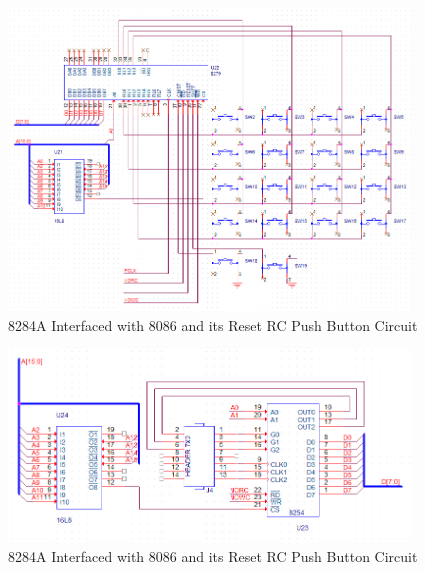         \begin{figure}[ht]
            \begin{center}
                \includegraphics[width=0.95\textwidth]{figures/schematics/page6.png}
                \caption{8284A Interfaced with 8086 and its Reset RC Push Button Circuit} \label{fig:page6}
            \end{center}
        \end{figure}

        \begin{figure}[ht]
            \begin{center}
                \includegraphics[width=0.95\textwidth]{figures/schematics/page7.png}
                \caption{8284A Interfaced with 8086 and its Reset RC Push Button Circuit} \label{fig:page7}
            \end{center}
        \end{figure}

